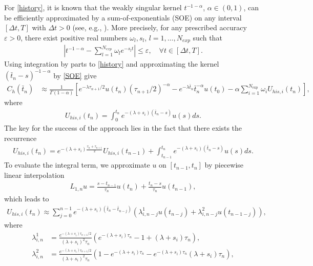 \documentclass[10pt, reqno]{amsart}
\theoremstyle{remark}
\theoremstyle{definition}
\numberwithin{table}{section}
\begin{document}
For \eqref{history}, it is known that the weakly singular kernel $t^{-1-\alpha}$, $\alpha \in (0,1)$, can be efficiently approximated by a sum-of-exponentials (SOE) on any interval $[\Delta t, T]$ with $\Delta t > 0$ (see, e.g., \cite{beylkin2005,cao2020,zheng2025}). More precisely, for any prescribed accuracy $\varepsilon > 0$, there exist positive real numbers ${\omega_l, s_l}$, $l=1,\dots,N_{exp}$ such that
\begin{align}
    |t^{-1-\alpha}-\sum_{l=1}^{N_{exp}}\omega_le^{-s_lt}|\leq \varepsilon, \quad \forall t\in [\Delta t,T].\label{SOE}
\end{align}
 Using integration by parts to \eqref{history} and approximating the kernel $(\bar t_n-s)^{-1-\alpha}$ by \eqref{SOE} give
\begin{align}\label{Ch}
C_h(\bar{t}_n) 
& \approx \frac{1}{\Gamma(1-\alpha)}[e^{-\lambda {\tau_{n+1}}/{2}} u(t_{n}){({\tau_{n+1}}/{2})^{-\alpha}}-{e^{-\lambda \bar{t}_n}}{\bar{t}_n^{-\alpha}} u(t_0)-\alpha \sum_{i=1}^{N_{\text {exp }}} \omega_i U_{h i s,  i}(t_n)],
\end{align}
where 
\begin{align}
    U_{h i s,  i}(t_n)=\int_0^{t_{n}} e^{-(\lambda+s_i)(\bar{t}_n-s)} u(s) d s.
\end{align}  
The key for the success of the approach lies in the fact that there exists the recurrence
\begin{align}
U_{h i s,  i}(t_n)=e^{-(\lambda+s_i) \frac{\tau_n+\tau_{n+1}}{2}} U_{h i s,  i}(t_{n-1})+\int_{t_{n-1}}^{t_{n}} e^{-(\lambda+s_i)(\bar{t}_n-s)} u(s) d s . \label{Uequa}
\end{align}
To evaluate the integral term, we approximate $u$ on $[t_{n-1}, t_n]$ by piecewise linear interpolation
\begin{align}
    L_{1,  n} u = \frac{s-t_{n-1}}{\tau_{n}}u(t_{n})+\frac{t_{n}-s}{\tau_{n}}u(t_{n-1}),\label{interpolation}
\end{align}
which leads to
\begin{align}
    U_{his, i}(t_n) \approx \sum_{j=0}^{n-1} e^{-(\lambda+s_i)(\bar{t}_n-\bar{t}_{n-j})}(\lambda_{i,  n-j}^1 u(t_{n-j})+\lambda_{i,  n-j}^2 u(t_{n-1-j})),
\end{align}
where 
\begin{equation}\label{lambda}
    \begin{aligned}
        \lambda_{i, n}^1
        &=\frac{e^{-(\lambda+s_i){\tau_{n+1}}/{2}}}{(\lambda+s_i)^2\tau_{n}}(e^{-(\lambda+s_i) \tau_{n}}-1+(\lambda+s_i) \tau_{n}), \\
        \lambda_{i, n}^{2}
        &=\frac{e^{-(\lambda+s_i){\tau_{n+1}}/{2}}}{(\lambda+s_i)^2\tau_{n}}(1-e^{-(\lambda+s_i) \tau_{n}}-e^{-(\lambda+s_i) \tau_{n}}(\lambda+s_i) \tau_{n}),
    \end{aligned}
\end{equation}
\end{document}
